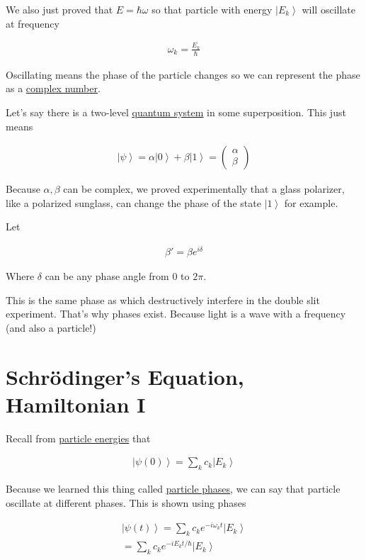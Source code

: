 \documentclass[
]{article}
\let\oldhyperref\hyperref
\renewcommand{\hyperref}[2][]{\oldhyperref[#1]{\underline{#2}}}
\providecommand{\ket}[1]{\left\lvert #1 \right\rangle}
\begin{document}
We also just proved that \(E=\hbar\omega\) so that particle with energy
\(\ket{E_k}\) will oscillate at frequency

\begin{gather*}
	\omega_k=\frac{E_k}{\hbar}
\end{gather*}

Oscillating means the phase of the particle changes so we can represent
the phase as a \hyperref[complex-numbers]{complex number}.

Let's say there is a two-level \hyperref[quantum-system]{quantum system} in some superposition.
This just means

\begin{gather*}
	\ket{\psi}=\alpha\ket{0}+\beta\ket{1}=\begin{pmatrix} \alpha\\\beta\end{pmatrix}
\end{gather*}

Because \(\alpha,\beta\) can be complex, we proved experimentally that a
glass polarizer, like a polarized sunglass, can change the phase of the
state \(\ket{1}\) for example.

Let

\begin{gather*}
	\beta'=\beta e^{i\delta}
\end{gather*}

Where \(\delta\) can be any phase angle from 0 to \(2\pi\).

This is the same phase as which destructively interfere in the double
slit experiment. That's why phases exist. Because light is a wave with a
frequency (and also a particle!)


\section{Schrödinger's Equation, Hamiltonian I
 }\label{schruxf6dingers-equation-hamiltonian}

Recall from \hyperref[particle-energies]{particle energies} that

\begin{gather*}
	\ket{\psi(0)}=\sum_kc_k\ket{E_k}
\end{gather*}

Because we learned this thing called \hyperref[particle-phases]{particle phases}, we can say that particle
oscillate at different phases. This is shown using phases

\begin{gather*}
	\ket{\psi(t)}=\sum_kc_ke^{-i\omega_kt}\ket{E_k}\\
	=\sum_kc_ke^{-iE_kt/\hbar}\ket{E_k}\\
\end{gather*}
\end{document}
